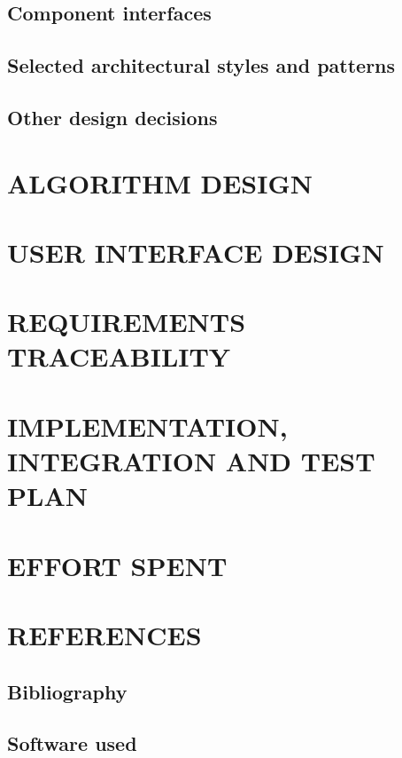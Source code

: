 \documentclass[11pt]{report}
\begin{document}
		\section{Component interfaces}
		\label{sect:Component interfaces}
			
		
		\section{Selected architectural styles and patterns}
		\label{sect:Selected architectural styles and patterns}
			
		
		\section{Other design decisions}
		\label{sect:Other design decisions}
			
			
	\chapter{ALGORITHM DESIGN}
	\label{ch:ALGORITHM DESIGN}
		
			
	\chapter{USER INTERFACE DESIGN}
	\label{ch:USER INTERFACE DESIGN}
		
	
	\chapter{REQUIREMENTS TRACEABILITY}
	\label{ch:REQUIREMENTS TRACEABILITY}
		
			
	\chapter{IMPLEMENTATION, INTEGRATION AND TEST PLAN}
	\label{ch:IMPLEMENTATION, INTEGRATION AND TEST PLAN}
		
			
	\chapter{EFFORT SPENT}
	\label{ch:EFFORT SPENT}
		
		
	\chapter{REFERENCES}
	\label{ch:REFERENCES}
	
		\section{Bibliography}
		\label{sect: Bibliography}
		
		
		\section{Software used}
		\label{sect: Software used}
		
		
\end{document}
